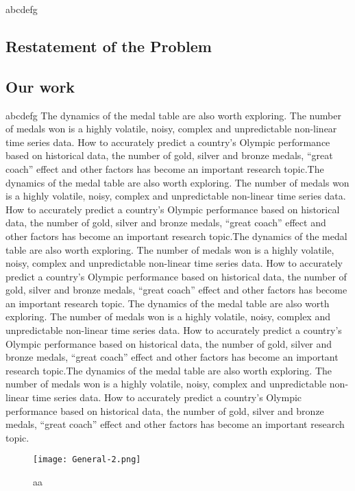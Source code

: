 \documentclass{mcmthesis}
\begin{document}
abcdefg

\subsection{Restatement of the Problem}
\subsection{Our work}
abcdefg
The dynamics of the medal table are also worth exploring. The number of medals won is a highly volatile, noisy, complex and unpredictable non-linear time series data. How to accurately predict a country's Olympic performance based on historical data, the number of gold, silver and bronze medals, “great coach” effect and other factors has become an important research topic.The dynamics of the medal table are also worth exploring. The number of medals won is a highly volatile, noisy, complex and unpredictable non-linear time series data. How to accurately predict a country's Olympic performance based on historical data, the number of gold, silver and bronze medals, “great coach” effect and other factors has become an important research topic.The dynamics of the medal table are also worth exploring. The number of medals won is a highly volatile, noisy, complex and unpredictable non-linear time series data. How to accurately predict a country's Olympic performance based on historical data, the number of gold, silver and bronze medals, “great coach” effect and other factors has become an important research topic.
The dynamics of the medal table are also worth exploring. The number of medals won is a highly volatile, noisy, complex and unpredictable non-linear time series data. How to accurately predict a country's Olympic performance based on historical data, the number of gold, silver and bronze medals, “great coach” effect and other factors has become an important research topic.The dynamics of the medal table are also worth exploring. The number of medals won is a highly volatile, noisy, complex and unpredictable non-linear time series data. How to accurately predict a country's Olympic performance based on historical data, the number of gold, silver and bronze medals, “great coach” effect and other factors has become an important research topic.
\begin{figure}[h]
  \small
  \centering
  \texttt{[image: General-2.png]}
  \caption{aa} \label{fig:aa}
  \end{figure}
  
\end{document}
